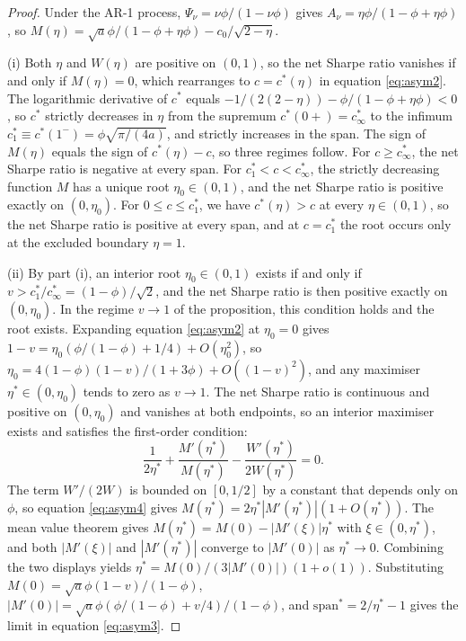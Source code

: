 \documentclass[hidelinks]{siamonline250211}
\newcommand{\spn}{\mathrm{span}}
\begin{document}
\begin{proof}
	Under the AR-1 process, $\Psi_{\nu} = \nu\phi/(1-\nu\phi)$ gives $A_{\nu} = \eta\phi/(1-\phi+\eta\phi)$, so $M(\eta) = \sqrt{a}\phi/(1-\phi+\eta\phi) - c_{0}/\sqrt{2-\eta}$.
	
	(i) Both $\eta$ and $W(\eta)$ are positive on $(0,1)$, so the net Sharpe ratio vanishes if and only if $M(\eta)=0$, which rearranges to $c = c^{*}(\eta)$ in equation \eqref{eq:asym2}. The logarithmic derivative of $c^{*}$ equals $-1/(2(2-\eta)) - \phi/(1-\phi+\eta\phi) < 0$, so $c^{*}$ strictly decreases in $\eta$ from the supremum $c^{*}(0+) = c^{*}_{\infty}$ to the infimum $c^{*}_{1} \equiv c^{*}(1^{-}) = \phi\sqrt{\pi/(4a)}$, and strictly increases in the span. The sign of $M(\eta)$ equals the sign of $c^{*}(\eta) - c$, so three regimes follow. For $c \geq c^{*}_{\infty}$, the net Sharpe ratio is negative at every span. For $c^{*}_{1} < c < c^{*}_{\infty}$, the strictly decreasing function $M$ has a unique root $\eta_{0} \in (0,1)$, and the net Sharpe ratio is positive exactly on $(0, \eta_{0})$. For $0 \leq c \leq c^{*}_{1}$, we have $c^{*}(\eta) > c$ at every $\eta \in (0,1)$, so the net Sharpe ratio is positive at every span, and at $c = c^{*}_{1}$ the root occurs only at the excluded boundary $\eta = 1$.
	
	(ii) By part (i), an interior root $\eta_{0} \in (0,1)$ exists if and only if $v > c^{*}_{1}/c^{*}_{\infty} = (1-\phi)/\sqrt{2}$, and the net Sharpe ratio is then positive exactly on $(0, \eta_{0})$. In the regime $v \to 1$ of the proposition, this condition holds and the root exists. Expanding equation \eqref{eq:asym2} at $\eta_{0}=0$ gives $1 - v = \eta_{0}\left( \phi/(1-\phi) + 1/4 \right) + O(\eta^{2}_{0})$, so $\eta_{0} = 4(1-\phi)(1-v)/(1+3\phi) + O\left((1-v)^{2}\right)$, and any maximiser $\eta^{*} \in (0, \eta_{0})$ tends to zero as $v \to 1$. The net Sharpe ratio is continuous and positive on $(0,\eta_{0})$ and vanishes at both endpoints, so an interior maximiser exists and satisfies the first-order condition:
	\begin{equation}\label{eq:asym4}
		\frac{1}{2\eta^{*}} + \frac{M'(\eta^{*})}{M(\eta^{*})} - \frac{W'(\eta^{*})}{2W(\eta^{*})} = 0.
	\end{equation}
	The term $W'/(2W)$ is bounded on $[0, 1/2]$ by a constant that depends only on $\phi$, so equation \eqref{eq:asym4} gives $M(\eta^{*}) = 2\eta^{*}|M'(\eta^{*})|\left(1+O(\eta^{*})\right)$. The mean value theorem gives $M(\eta^{*}) = M(0) - |M'(\xi)|\eta^{*}$ with $\xi \in (0, \eta^{*})$, and both $|M'(\xi)|$ and $|M'(\eta^{*})|$ converge to $|M'(0)|$ as $\eta^{*} \to 0$. Combining the two displays yields $\eta^{*} = M(0)/\left(3|M'(0)|\right)\left(1+o(1)\right)$. Substituting $M(0) = \sqrt{a}\phi(1-v)/(1-\phi)$, $|M'(0)| = \sqrt{a}\phi\left(\phi/(1-\phi) + v/4\right)/(1-\phi)$, and $\spn^{*} = 2/\eta^{*} - 1$ gives the limit in equation \eqref{eq:asym3}.
\end{proof}
\end{document}
